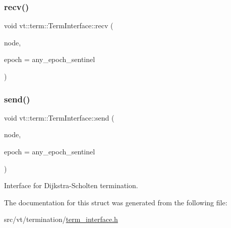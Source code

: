 \mbox{\label{structvt_1_1term_1_1_term_interface_afffcd1367305830597216a7b48886cb1}} 
\subsubsection{\texorpdfstring{recv()}{recv()}}
{\footnotesize\ttfamily void vt\+::term\+::\+Term\+Interface\+::recv (\begin{DoxyParamCaption}\item[{\hyperlink{namespacevt_a866da9d0efc19c0a1ce79e9e492f47e2}{Node\+Type} const \&}]{node,  }\item[{\hyperlink{namespacevt_a81d11b28122d43bf9834577e4a06440f}{Epoch\+Type} const \&}]{epoch = {\ttfamily any\+\_\+epoch\+\_\+sentinel} }\end{DoxyParamCaption})}

\mbox{\label{structvt_1_1term_1_1_term_interface_a21ef75badf08fea19807204e502ec4fe}} 
\subsubsection{\texorpdfstring{send()}{send()}}
{\footnotesize\ttfamily void vt\+::term\+::\+Term\+Interface\+::send (\begin{DoxyParamCaption}\item[{\hyperlink{namespacevt_a866da9d0efc19c0a1ce79e9e492f47e2}{Node\+Type} const \&}]{node,  }\item[{\hyperlink{namespacevt_a81d11b28122d43bf9834577e4a06440f}{Epoch\+Type} const \&}]{epoch = {\ttfamily any\+\_\+epoch\+\_\+sentinel} }\end{DoxyParamCaption})}



Interface for Dijkstra-\/\+Scholten termination. 



The documentation for this struct was generated from the following file\+:\begin{DoxyCompactItemize}
\item 
src/vt/termination/\hyperlink{term__interface_8h}{term\+\_\+interface.\+h}\end{DoxyCompactItemize}
